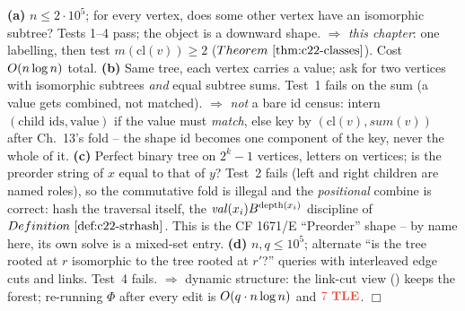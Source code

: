 \begin{tracebox}
\textbf{(a)} \(n\le2\cdot10^5\); for every vertex, does some other vertex have an
isomorphic subtree?  Tests 1--4 pass; the object is a downward shape.
\(\Rightarrow\) \emph{this chapter}: one labelling, then test
\(m(\mathrm{cl}(v))\ge2\) (\(\thmref{c22-classes}\)).  Cost \(O(n\log n)\) total.
\textbf{(b)} Same tree, each vertex carries a value; ask for two vertices with
isomorphic subtrees \emph{and} equal subtree sums.  Test~1 fails on the sum (a
value gets combined, not matched).  \(\Rightarrow\) \emph{not} a bare id census:
intern \((\text{child ids}, \text{value})\) if the value must \emph{match}, else
key by \((\mathrm{cl}(v), \mathit{sum}(v))\) after Ch.~13's fold -- the shape id
becomes one component of the key, never the whole of it.
\textbf{(c)} Perfect binary tree on \(2^k-1\) vertices, letters on vertices; is the
preorder string of \(x\) equal to that of \(y\)?  Test~2 fails (left and right
children are named roles), so the commutative fold is illegal and the
\emph{positional} combine is correct: hash the traversal itself, the
\(\mathit{val}(x_i)B^{\operatorname{depth}(x_i)}\) discipline of \(\defref{c22-strhash}\).  This
is the CF 1671/E ``Preorder'' shape -- by name here, its own solve is a mixed-set
entry.
\textbf{(d)} \(n,q\le10^5\); alternate ``is the tree rooted at \(r\) isomorphic to
the tree rooted at \(r'\)?'' queries with interleaved edge cuts and links.  Test~4
fails.  \(\Rightarrow\) dynamic structure: the link-cut view () keeps the
forest; re-running \(\Phi\) after every edit is
\(O(q\cdot n\log n)\) and \(\tle\).  \(\Box\)
\end{tracebox}

